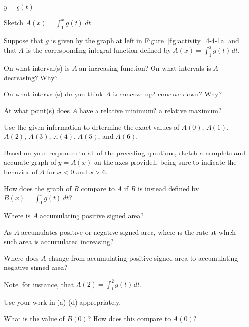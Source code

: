 \begin{marginfigure} %
\caption{$y = g(t)$} \label{fig:activity_4-4-1a}
\end{marginfigure}

\begin{marginfigure} %
\caption{Sketch $A(x) = \int_1^x g(t) \ dt$} \label{fig:activity_4-4-1b}
\end{marginfigure}

\begin{activity} \label{A:4.4.2}  
Suppose that $g$ is given by the graph at left in Figure~\ref{fig:activity_4-4-1a} and that $A$ is the corresponding integral function defined by $A(x) = \int_1^x g(t) \, dt$.
\ba
	\item On what interval(s) is $A$ an increasing function?  On what intervals is $A$ decreasing?  Why?
	\item On what interval(s) do you think $A$ is concave up?  concave down?  Why?
	\item At what point(s) does $A$ have a relative minimum?  a relative maximum?
	\item Use the given information to determine the exact values of $A(0)$, $A(1)$, $A(2)$, $A(3)$, $A(4)$, $A(5)$, and $A(6)$.
	\item Based on your responses to all of the preceding questions, sketch a complete and accurate graph of $y = A(x)$ on the axes provided, being sure to indicate the behavior of $A$ for $x < 0$ and $x > 6$.
	\item How does the graph of $B$ compare to $A$ if $B$ is instead defined by $B(x) = \int_0^x g(t) \, dt$?
\ea

\end{activity}
\begin{smallhint}
 \ba
	\item Where is $A$ accumulating positive signed area?	
	\item As $A$ accumulates positive or negative signed area, where is the rate at which such area is accumulated increasing?
	\item Where does $A$ change from accumulating positive signed area to accumulating negative signed area?
	\item Note, for instance, that $A(2) = \int_1^2 g(t) \, dt$.
	\item Use your work in (a)-(d) appropriately.
	\item What is the value of $B(0)$?  How does this compare to $A(0)$?
\ea
\end{smallhint}
